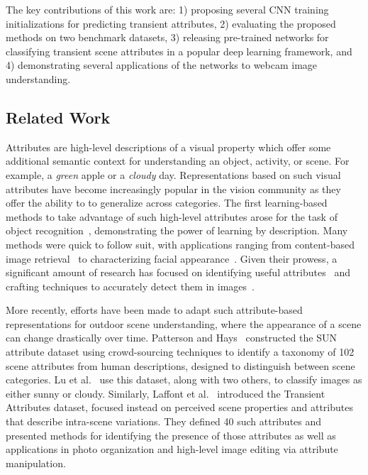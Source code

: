 \documentclass[10pt,twocolumn,letterpaper]{article}
\newcommand{\todo}[1]{\textcolor{red}{todo: {\em #1}}}
\begin{document}


The key contributions of this work are: 1) proposing several CNN
training initializations for predicting transient attributes, 2) evaluating
the proposed methods on two benchmark datasets, 3) releasing
pre-trained networks for classifying transient scene attributes in a
popular deep learning framework, and 4) demonstrating several
applications of the networks to webcam image understanding. 

\subsection{Related Work}
Attributes are high-level descriptions of a visual property which offer some
additional semantic context for understanding an object, activity, or scene.
For example, a \emph{green} apple or a \emph{cloudy} day. Representations based
on such visual attributes have become increasingly popular in the vision
community as they offer the ability to to generalize across categories. The
first learning-based methods to take advantage of such high-level attributes
arose for the task of object
recognition~\cite{farhadi2009describing,lampert2009learning}, demonstrating the
power of learning by description. Many methods were quick to follow suit, with
applications ranging from content-based image
retrieval~\cite{siddiquie2011image} to characterizing facial
appearance~\cite{kumar2011describable}. Given their prowess, a significant
amount of research has focused on identifying useful
attributes~\cite{berg2010automatic} and crafting techniques to accurately
detect them in images~\cite{vedaldi2014understanding}. 

More recently, efforts have been made to adapt such attribute-based
representations for outdoor scene understanding, where the appearance of a
scene can change drastically over time.  Patterson and
Hays~\cite{patterson2012sun} constructed the SUN attribute dataset using
crowd-sourcing techniques to identify a taxonomy of 102 scene attributes from
human descriptions, designed to distinguish between scene categories. Lu et
al.~\cite{lutwoclass} use this dataset, along with two others, to classify
images as either sunny or cloudy.  Similarly, Laffont et al.~\cite{Laffont14}
introduced the Transient Attributes dataset, focused instead on perceived scene
properties and attributes that describe intra-scene variations. They defined 40
such attributes and presented methods for identifying the presence of those
attributes as well as applications in photo organization and high-level image
editing via attribute manipulation. 
\end{document}
